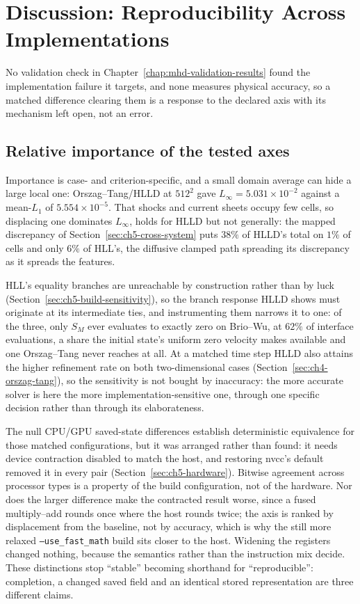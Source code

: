 
\chapter{Discussion: Reproducibility Across Implementations}
\label{chap:reproducibility-discussion}

No validation check in Chapter~\ref{chap:mhd-validation-results} found the
implementation failure it targets, and none measures physical accuracy, so a
matched difference clearing them is a response to the declared axis with its
mechanism left open, not an error.

\section{Relative importance of the tested axes}
\label{sec:ch6-relative-importance}

Importance is case- and criterion-specific, and a small domain average can hide
a large local one: Orszag--Tang/HLLD at $512^2$ gave
$L_\infty=5.031\times10^{-2}$ against a mean-$L_1$ of $5.554\times10^{-5}$. That
shocks and current sheets occupy few cells, so displacing one dominates
$L_\infty$, holds for HLLD but not generally: the mapped
discrepancy of Section~\ref{sec:ch5-cross-system} puts $38\%$ of HLLD's total on
$1\%$ of cells and only $6\%$ of HLL's, the diffusive clamped path spreading its
discrepancy as it spreads the features.

HLL's equality branches are unreachable by construction rather than by luck
(Section~\ref{sec:ch5-build-sensitivity}), so the branch response HLLD shows must
originate at its intermediate ties, and instrumenting them narrows it to one: of
the three, only $S_M$ ever evaluates to
exactly zero on Brio--Wu, at $62\%$ of interface evaluations, a share the
initial state's uniform zero velocity makes available and one Orszag--Tang never
reaches at all. At a matched time step HLLD also attains the higher
refinement rate on both two-dimensional cases
(Section~\ref{sec:ch4-orszag-tang}), so the sensitivity is not bought by
inaccuracy: the more accurate solver is here the more implementation-sensitive
one, through one specific decision rather than through its elaborateness.

The null CPU/GPU saved-state differences establish deterministic equivalence for
those matched configurations, but it was arranged rather than found: it needs
device contraction disabled to match the host, and restoring nvcc's default
removed it in every pair (Section~\ref{sec:ch5-hardware}). Bitwise agreement
across processor types is a property of the build configuration, not of the
hardware. Nor does the larger difference make the contracted result worse, since
a fused multiply--add rounds once where the host rounds twice; the axis is
ranked by displacement from the baseline, not by accuracy, which is why the
still more relaxed \texttt{--use\_fast\_math} build sits closer to the host.
Widening the registers changed nothing, because the semantics rather than the
instruction mix decide. These distinctions stop ``stable'' becoming shorthand
for ``reproducible'': completion, a changed saved field and an identical stored
representation are three different claims.

